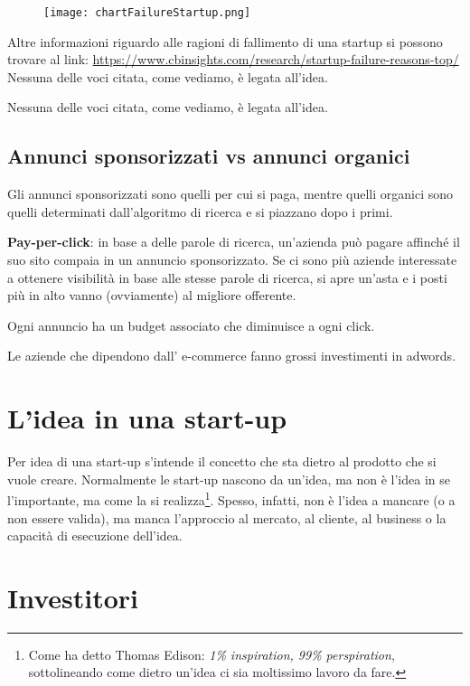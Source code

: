 \begin{figure}[H]
\texttt{[image: chartFailureStartup.png]}
\end{figure}

Altre informazioni riguardo alle ragioni di fallimento di una startup si possono
trovare al link: \url{https://www.cbinsights.com/research/startup-failure-reasons-top/}
Nessuna delle voci citata, come vediamo, è legata all'idea.

Nessuna delle voci citata, come vediamo, è legata all'idea.

\subsection{Annunci sponsorizzati vs annunci organici}

Gli annunci sponsorizzati sono quelli per cui si paga, mentre quelli organici sono
quelli determinati dall'algoritmo di ricerca e si piazzano dopo i primi.

\textbf{Pay-per-click}: in base a delle parole di ricerca, un'azienda può pagare
affinché il suo sito compaia in un annuncio sponsorizzato. Se ci sono più aziende
interessate a ottenere visibilità in base alle stesse parole di ricerca, si apre
un'asta e i posti più in alto vanno (ovviamente) al migliore offerente.

Ogni annuncio ha un budget associato che diminuisce a ogni click.

Le aziende che dipendono dall' e-commerce fanno grossi investimenti in adwords.

\section{L'idea in una start-up}

Per idea di una start-up s'intende il concetto che sta dietro al prodotto che
si vuole creare. Normalmente le start-up nascono da un'idea, ma non è l'idea in
se l'importante, ma come la si realizza\footnote{Come ha detto Thomas Edison:
\emph{1\% inspiration, 99\% perspiration}, sottolineando come dietro un'idea
ci sia moltissimo lavoro da fare.}. Spesso, infatti, non è l'idea a mancare
(o a non essere valida), ma manca l'approccio al mercato, al cliente, al 
business o la capacità di esecuzione dell'idea.

\section{Investitori}

